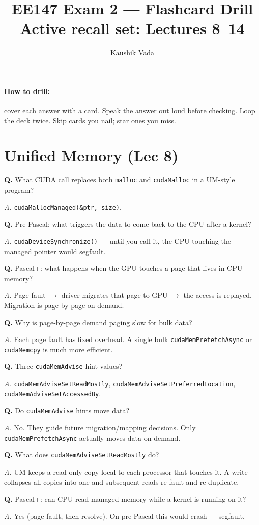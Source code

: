 \documentclass[10pt]{article}
\title{\vspace{-1.5em}\textbf{EE147 Exam 2 — Flashcard Drill}\\
\large Active recall set: Lectures 8--14}
\author{Kaushik Vada}
\date{}
\newcommand{\q}[1]{\par\vspace{6pt}\noindent\textbf{Q.} #1}
\newcommand{\ans}[1]{\par\noindent\textit{A.} #1\par}
\begin{document}
\maketitle
\vspace{-3em}

\paragraph{How to drill:} cover each answer with a card. Speak the answer out loud before checking. Loop the deck twice. Skip cards you nail; star ones you miss.

\hrulefill

\section*{Unified Memory (Lec 8)}

\q{What CUDA call replaces both \texttt{malloc} and \texttt{cudaMalloc} in a UM-style program?}
\ans{\texttt{cudaMallocManaged(\&ptr, size)}.}

\q{Pre-Pascal: what triggers the data to come back to the CPU after a kernel?}
\ans{\texttt{cudaDeviceSynchronize()} — until you call it, the CPU touching the managed pointer would segfault.}

\q{Pascal+: what happens when the GPU touches a page that lives in CPU memory?}
\ans{Page fault $\rightarrow$ driver migrates that page to GPU $\rightarrow$ the access is replayed. Migration is page-by-page on demand.}

\q{Why is page-by-page demand paging slow for bulk data?}
\ans{Each page fault has fixed overhead. A single bulk \texttt{cudaMemPrefetchAsync} or \texttt{cudaMemcpy} is much more efficient.}

\q{Three \texttt{cudaMemAdvise} hint values?}
\ans{\texttt{cudaMemAdviseSetReadMostly}, \texttt{cudaMemAdviseSetPreferredLocation}, \texttt{cudaMemAdviseSetAccessedBy}.}

\q{Do \texttt{cudaMemAdvise} hints move data?}
\ans{No. They guide future migration/mapping decisions. Only \texttt{cudaMemPrefetchAsync} actually moves data on demand.}

\q{What does \texttt{cudaMemAdviseSetReadMostly} do?}
\ans{UM keeps a read-only copy local to each processor that touches it. A write collapses all copies into one and subsequent reads re-fault and re-duplicate.}

\q{Pascal+: can CPU read managed memory while a kernel is running on it?}
\ans{Yes (page fault, then resolve). On pre-Pascal this would crash — segfault.}
\end{document}
